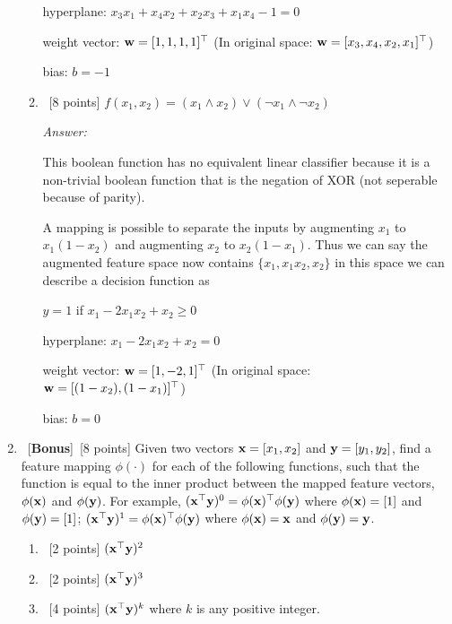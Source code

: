 \documentclass[12pt, fullpage,letterpaper]{article}
\begin{document}
\begin{enumerate}
\begin{enumerate}
		hyperplane: $x_3 x_1 + x_4 x_2 + x_2 x_3 + x_1 x_4 - 1 = 0$

		weight vector: ${\bf w} = [1, 1, 1, 1]^\top$ (In original space: ${\bf w} = [x_3, x_4, x_2, x_1]^\top$)

		bias: $b = -1$

		\item ~[8 points] $f(x_1, x_2) = (x_1 \land x_2) \lor (\neg x_1 \land \neg x_2)$

		\textit{Answer:}

		This boolean function has no equivalent linear classifier because it is a non-trivial boolean function that is the negation of XOR (not seperable because of parity).

		A mapping is possible to separate the inputs by augmenting $x_1$ to $x_1 (1 - x_2)$ and augmenting $x_2$ to $x_2 (1 - x_1)$.
		Thus we can say the augmented feature space now contains $\{x_1, x_1 x_2, x_2\}$ in this space we can describe a decision function as 

		$ y = 1$ if $x_1 - 2 x_1 x_2 + x_2 \ge 0$

		hyperplane: $x_1 - 2 x_1 x_2 + x_2 = 0$

		weight vector: ${\bf w} = [1, -2, 1]^\top$ (In original space: ${\bf w} = [(1 - x_2), (1 - x_1)]^\top$)

		bias: $b = 0$



	\end{enumerate}
		
	
	\item~[\textbf{Bonus}]~[8 points]  Given two vectors ${\bf x} = [x_1,  x_2]$ and ${\bf y}=[y_1,  y_2]$, find a feature mapping $\phi(\cdot)$ for each of the following functions, such that the function is equal to the inner product between the mapped feature vectors, $\phi({\bf x})$ and $\phi({\bf y})$. For example, $({\bf x}^\top {\bf y})^0 = \phi({\bf x})^\top \phi({\bf y})$ where $\phi({\bf x}) = [1]$ and $\phi({\bf y}) = [1]$; $({\bf x}^\top {\bf y})^1 = \phi({\bf x})^\top \phi({\bf y})$ where $\phi({\bf x}) = {\bf x}$ and $\phi({\bf y}) = {\bf y}$. 
	\begin{enumerate}
		\item~[2 points] $({\bf x}^\top {\bf y})^2$
		\item~[2 points] $({\bf x}^\top {\bf y})^3$
		\item~[4 points] $({\bf x}^\top {\bf y})^k$ where $k$ is  any positive integer.  
	\end{enumerate}


\end{enumerate}
\end{document}
